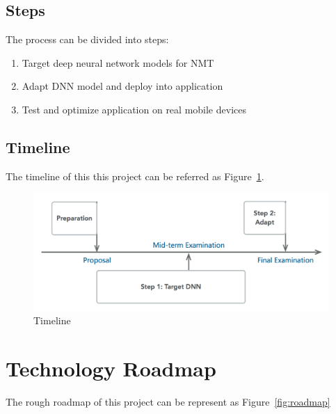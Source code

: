 \documentclass[a4paper, 12pt]{article}
\begin{document}
\subsection{Steps}
The process can be divided into steps:
\begin{enumerate}
	\item Target deep neural network models for NMT
	\item Adapt DNN model and deploy into application
	\item Test and optimize application on real mobile devices
\end{enumerate}

\subsection{Timeline}
The timeline of this this project can be referred as Figure~\ref{fig:timeline}.

\begin{figure}[H]
\centering
\includegraphics[scale=0.7]{timeline.png}
\caption{\label{fig:timeline}Timeline}
\end{figure}


\section{Technology Roadmap}
The rough roadmap of this project can be represent as Figure~\ref{fig:roadmap}
\end{document}
